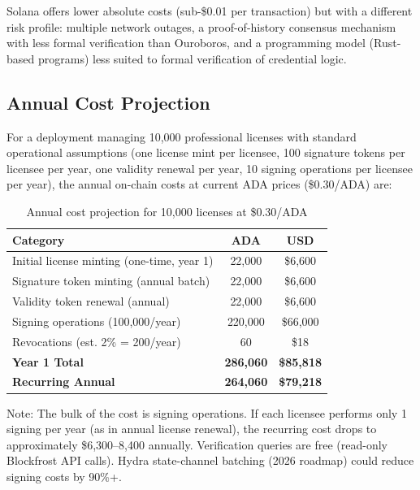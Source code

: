 Solana offers lower absolute costs (sub-\$0.01 per transaction) but with a different risk profile: multiple network outages, a proof-of-history consensus mechanism with less formal verification than Ouroboros, and a programming model (Rust-based programs) less suited to formal verification of credential logic.

\subsection{Annual Cost Projection}

For a deployment managing 10,000 professional licenses with standard operational assumptions (one license mint per licensee, 100 signature tokens per licensee per year, one validity renewal per year, 10 signing operations per licensee per year), the annual on-chain costs at current ADA prices (\$0.30/ADA) are:

\begin{table}[htbp]
\centering
\caption{Annual cost projection for 10,000 licenses at \$0.30/ADA}
\label{tab:ch5-annual}
\small
\begin{tabular}{@{}p{5cm}cc@{}}
\toprule
\textbf{Category} & \textbf{ADA} & \textbf{USD} \\
\midrule
Initial license minting (one-time, year 1) & 22,000 & \$6,600 \\
Signature token minting (annual batch) & 22,000 & \$6,600 \\
Validity token renewal (annual) & 22,000 & \$6,600 \\
Signing operations (100,000/year) & 220,000 & \$66,000 \\
Revocations (est. 2\% = 200/year) & 60 & \$18 \\
\midrule
\textbf{Year 1 Total} & \textbf{286,060} & \textbf{\$85,818} \\
\textbf{Recurring Annual} & \textbf{264,060} & \textbf{\$79,218} \\
\bottomrule
\end{tabular}

\vspace{4pt}
\footnotesize
Note: The bulk of the cost is signing operations. If each licensee performs only 1 signing per year (as in annual license renewal), the recurring cost drops to approximately \$6,300--8,400 annually. Verification queries are free (read-only Blockfrost API calls). Hydra state-channel batching (2026 roadmap) could reduce signing costs by 90\%+.
\end{table}

